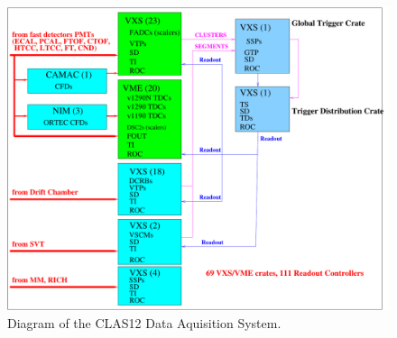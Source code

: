 \begin{figure}[hbt]
	\centering
	\includegraphics[width=1.0\columnwidth,keepaspectratio]{img/CLAS12_HARDWARE_2.pdf}
	\caption{Diagram of the CLAS12 Data Aquisition System. }
	\label{fig:DAQdiagram}
\end{figure}

